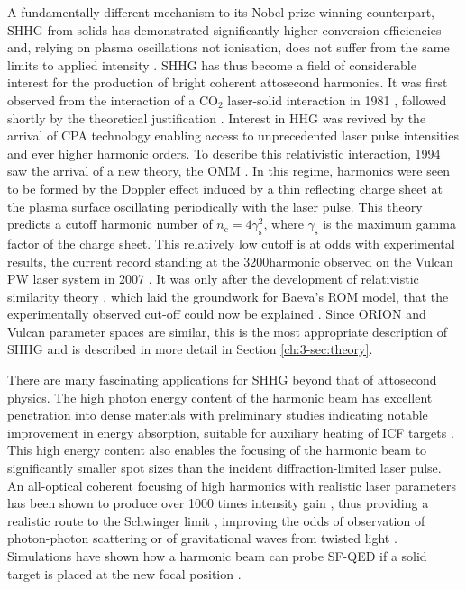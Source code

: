 A fundamentally different mechanism to its Nobel prize-winning counterpart, SHHG from solids has demonstrated significantly higher conversion efficiencies and, relying on plasma oscillations not ionisation, does not suffer from the same limits to applied intensity \cite{teubnerHighorderHarmonicsLaserirradiated2009}. SHHG has thus become a field of considerable interest for the production of bright coherent attosecond harmonics. It was first observed from the interaction of a CO$_2$ laser-solid interaction in 1981 \cite{carmanVisibleHarmonicEmission1981}, followed shortly by the theoretical justification \cite{bezzeridesPlasmaMechanismUltraviolet1982}. Interest in HHG was revived by the arrival of CPA technology enabling access to unprecedented laser pulse intensities and ever higher harmonic orders. To describe this relativistic interaction, 1994 saw the arrival of a new theory, the \ac{OMM} \cite{bulanovInteractionUltrashortRelativistically1994}. In this regime, harmonics were seen to be formed by the Doppler effect induced by a thin reflecting charge sheet at the plasma surface oscillating periodically with the laser pulse. This theory predicts a cutoff harmonic number of $n_\mathrm{c} = 4\gamma_\mathrm{s}^2 $, where $\gamma_\mathrm{s}$ is the maximum gamma factor of the charge sheet. This relatively low cutoff is at odds with experimental results, the current record standing at the 3200\th harmonic observed on the Vulcan PW laser system in 2007 \cite{dromeyBrightMultikeVHarmonic2007}. It was only after the development of relativistic similarity theory \cite{gordienkoScalingsUltrarelativisticLaser2005}, which laid the groundwork for Baeva's ROM model, that the experimentally observed cut-off could now be explained \cite{baevaTheoryHighorderHarmonic2006}. Since ORION and Vulcan parameter spaces are similar, this is the most appropriate description of SHHG and is described in more detail in Section \ref{ch:3-sec:theory}.

There are many fascinating applications for SHHG beyond that of attosecond physics. The high photon energy content of the harmonic beam has excellent penetration into dense materials with preliminary studies indicating notable improvement in energy absorption, suitable for auxiliary heating of ICF targets \cite{paddockEnergyGainWettedfoam2024}. This high energy content also enables the focusing of the harmonic beam to significantly smaller spot sizes than the incident diffraction-limited laser pulse. An all-optical coherent focusing of high harmonics with realistic laser parameters has been shown to produce over 1000 times intensity gain \cite{vincentiAchievingExtremeLight2019}, thus providing a realistic route to the Schwinger limit \cite{quereReflectingPetawattLasers2021}, improving the odds of observation of photon-photon scattering \cite{aboushelbayaOrbitalAngularMomentum2019} or of gravitational waves from twisted light \cite{atongaGravitationalWavesHighpower2023}. Simulations have shown how a harmonic beam can probe \ac{SF-QED} if a solid target is placed at the new focal position \cite{fedeliProbingStrongfieldQED2020}.

